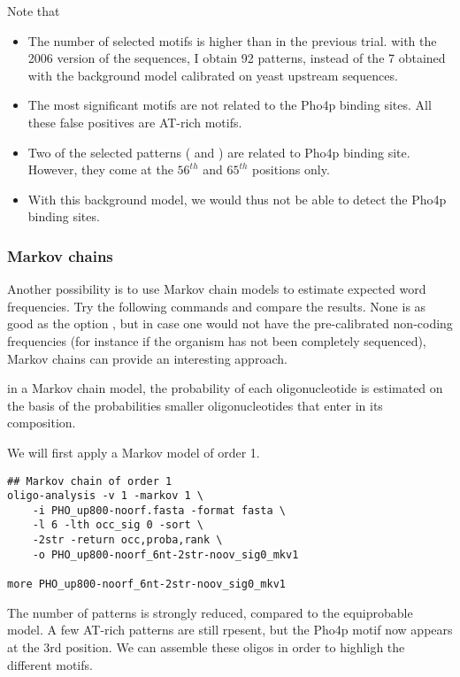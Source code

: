 Note that
\begin{itemize} 
\item The number of selected motifs is higher than in the previous
  trial. with the 2006 version of the sequences, I obtain 92 patterns,
  instead of the 7 obtained with the background model calibrated on
  yeast upstream sequences.
\item The most significant motifs are not related to the Pho4p binding
  sites. All these false positives are AT-rich motifs.
\item Two of the selected patterns ( and ) are
  related to Pho4p binding site. However, they come at the $56^{th}$ and
  $65^{th}$ positions only. 
\item With this background model, we would thus not be able to detect
  the Pho4p binding sites.
\end{itemize}

\subsubsection{Markov chains}

Another possibility is to use Markov chain models to estimate expected
word frequencies. Try the following commands and compare the
results. None is as good as the option ,
but in case one would not have the pre-calibrated non-coding
frequencies (for instance if the organism has not been completely
sequenced), Markov chains can provide an interesting approach. 

in a Markov chain model, the probability of each oligonucleotide is
estimated on the basis of the probabilities smaller oligonucleotides
that enter in its composition.

We will first apply a Markov model of order 1. 

{\color{Blue} \begin{footnotesize} 
\begin{verbatim}
## Markov chain of order 1
oligo-analysis -v 1 -markov 1 \
    -i PHO_up800-noorf.fasta -format fasta \
    -l 6 -lth occ_sig 0 -sort \
    -2str -return occ,proba,rank \
    -o PHO_up800-noorf_6nt-2str-noov_sig0_mkv1

more PHO_up800-noorf_6nt-2str-noov_sig0_mkv1

\end{verbatim} \end{footnotesize}
}

The number of patterns is strongly reduced, compared to the
equiprobable model. A few AT-rich patterns are still rpesent, but the
Pho4p motif now appears at the 3rd position. We can assemble these
oligos in order to highligh the different motifs.

